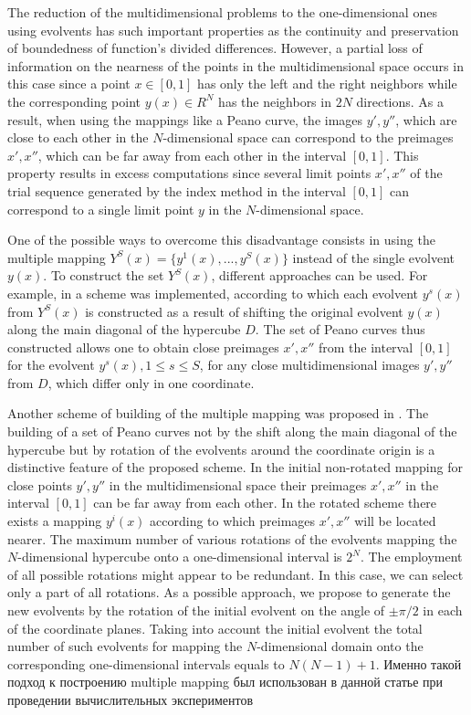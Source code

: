\documentclass[smallextended]{svjour3}       %
\begin{document}
The reduction of the multidimensional problems to the one-dimensional ones using evolvents has such important properties as the continuity and preservation of boundedness of function's divided differences. However, a partial loss of information on the nearness of the points in the multidimensional space occurs in this case since a point $x \in [0,1]$ has only the left and the right neighbors while the corresponding point $y(x) \in R^N$ has the neighbors in $2N$ directions. As a result, when using the mappings like a Peano curve, the images $y', y''$, which are close to each other in the $N$-dimensional space can correspond to the preimages $x', x''$, which can be far away from each other in the interval $[0,1]$. This property results in excess computations since several limit points $x', x''$ of the trial sequence generated by the index method in the interval $[0,1]$ can correspond to a single limit point $y$ in the $N$-dimensional space.

One of the possible ways to overcome this disadvantage consists in using the multiple mapping $Y^S(x)=\{ y^1 (x),...,y^S(x)\}$ instead of the single evolvent $y(x)$. To construct the set $Y^S(x)$, different approaches can be used. For example, in \cite{Strongin2000} a scheme was implemented, according to which each evolvent $y^s(x)$ from $Y^S(x)$ is constructed as a result of shifting the original evolvent $y(x)$ along the main diagonal of the hypercube $D$. The set of Peano curves thus constructed allows one to obtain close preimages $x', x''$ from the interval $[0,1]$ for the evolvent $y^s(x), 1\leq s \leq S$, for any close multidimensional images $y', y''$ from $D$, which differ only in one coordinate.

Another scheme of building of the multiple mapping was proposed  in \cite{6_Gergel2009}. The building of a set of Peano curves not by the shift along the main diagonal of the hypercube but by rotation of the evolvents around the coordinate origin is a distinctive feature of the proposed scheme. In the initial non-rotated mapping for close points $y', y''$ in the multidimensional space their preimages  $x', x''$ in the interval $[0,1]$ can be far away from each other. In the rotated scheme there exists a mapping $y^i(x)$ according to which preimages $x', x''$ will be located nearer. The maximum number of various rotations of the evolvents mapping the $N$-dimensional hypercube onto a one-dimensional interval is $2^N$. The employment of all possible rotations might appear to be redundant. In this case, we can select only a part of all rotations. As a possible approach, we propose to generate the new evolvents by the rotation of the initial evolvent on the angle of $\pm\pi/2$ in each of the coordinate planes. Taking into account the initial evolvent the total number of such evolvents for mapping the $N$-dimensional domain onto the corresponding one-dimensional intervals equals to $N(N-1)+1$. 
\Russian
Именно такой подход к построению multiple mapping был использован в данной статье при проведении вычислительных экспериментов
\end{document}
